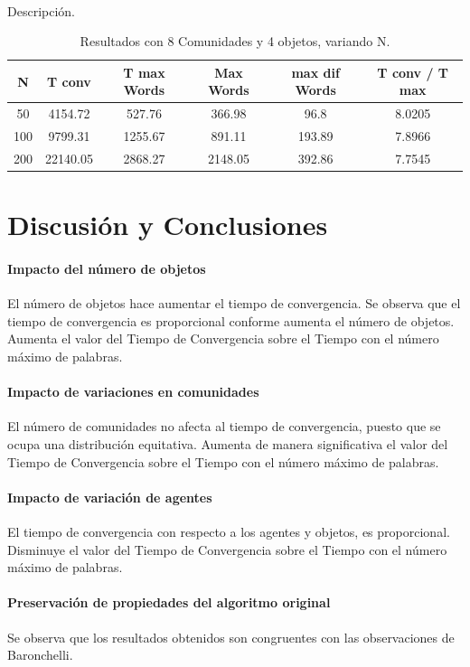 \documentclass[runningheads]{llncs}
\begin{document}
\paragraph{}Descripción.
\begin{table}[h]
	\centering
	\caption{Resultados con 8 Comunidades y 4 objetos, variando N.}\label{tab2}
	\begin{tabular}{|c|c|c|c|c|c|}
		\hline
		N &  T conv & T max Words & Max Words & max dif Words & T conv / T max  \\
		\hline
		50 & 4154.72 &   527.76 & 366.98 & 96.8 & 8.0205 \\
		\hline
		100 & 9799.31 &   1255.67 & 891.11 & 193.89 & 7.8966\\
		\hline
		200 & 22140.05 &  2868.27 & 2148.05 & 392.86 & 7.7545 \\
		\hline
	\end{tabular}
\end{table}
\section{Discusión y Conclusiones}
\paragraph{Impacto del número  de objetos}
El número de objetos hace aumentar el tiempo de convergencia. Se observa que el tiempo de convergencia es proporcional conforme aumenta el número de objetos. Aumenta el valor del Tiempo de Convergencia sobre el Tiempo con el número máximo de palabras.
\paragraph{Impacto de variaciones en comunidades}
El número de comunidades no afecta al tiempo de convergencia, puesto que se ocupa una distribución equitativa. Aumenta de manera significativa el valor del Tiempo de Convergencia sobre el Tiempo con el número máximo de palabras.
\paragraph{Impacto de variación de agentes}
El tiempo de convergencia con respecto a los agentes y objetos, es proporcional. Disminuye el valor del Tiempo de Convergencia sobre el Tiempo con el número máximo de palabras.
\paragraph{Preservación de propiedades del algoritmo original}
Se observa que los resultados obtenidos son congruentes con las observaciones de Baronchelli.
\end{document}
